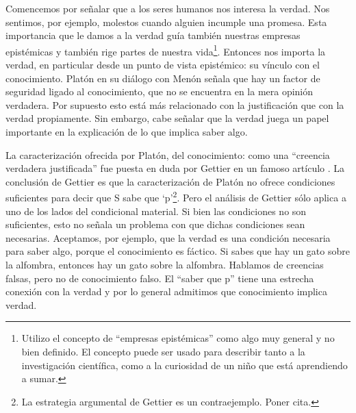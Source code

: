 \documentclass{article}
\begin{document}
Comencemos por señalar que a los seres humanos nos interesa la verdad. Nos sentimos, por ejemplo, molestos cuando alguien incumple una promesa. Esta importancia que le damos a la verdad guía también nuestras empresas epistémicas y también rige partes de nuestra vida\footnote{Utilizo el concepto de ``empresas epistémicas'' como algo muy general y no bien definido. El concepto puede ser usado para describir tanto a la investigación científica, como a la curiosidad de un niño que está aprendiendo a sumar.}. Entonces nos importa la verdad, en particular desde un punto de vista epistémico: su vínculo con el conocimiento. Platón en su diálogo con Menón \citeyear[\P\P 97a-98b]{platonmeno} señala que hay un factor de seguridad ligado al conocimiento, que no se encuentra en la mera opinión verdadera. Por supuesto esto está más relacionado con la justificación que con la verdad propiamente. Sin embargo, cabe señalar que la verdad juega un papel importante en la explicación de lo que implica saber algo. 

La caracterización ofrecida por Platón, del conocimiento: como una ``creencia verdadera justificada'' fue puesta en duda por Gettier en un famoso artículo \citeyear{Gettier}. La conclusión de Gettier es que la caracterización de Platón no ofrece condiciones suficientes para decir que S sabe que `p'\footnote{La estrategia argumental de Gettier es un contraejemplo. Poner cita.}. Pero el análisis de Gettier sólo aplica a uno de los lados del condicional material. Si bien las condiciones no son suficientes, esto no señala un problema con que dichas condiciones sean necesarias. Aceptamos, por ejemplo, que la verdad es una condición necesaria para saber algo, porque el conocimiento es fáctico. Si sabes que hay un gato sobre la alfombra, entonces hay un gato sobre la alfombra. Hablamos de creencias falsas, pero no de conocimiento falso. El ``saber que p'' tiene una estrecha conexión con la verdad y por lo general admitimos que conocimiento implica verdad.
\end{document}
